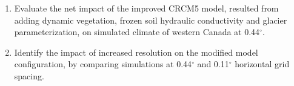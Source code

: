 \documentclass[a0b,landscape]{a0poster}
\begin{document}
\begin{multicols*}{4}
\vspace{0.25cm}
\begin{tcolorbox}[colback=white,colframe=green!40!black,adjusted title={Main objectives}]
  \begin{enumerate}
  \item Evaluate the net impact of the improved CRCM5 model, resulted from adding
        dynamic vegetation, frozen soil hydraulic conductivity and glacier
        parameterization, on simulated climate of western Canada at 0.44$^\circ$.
  \item Identify the impact of increased resolution on the modified model configuration,
        by comparing simulations at 0.44$^\circ$ and 0.11$^\circ$ horizontal grid
        spacing.
  \end{enumerate}
\end{tcolorbox}



\end{multicols*}
\end{document}
